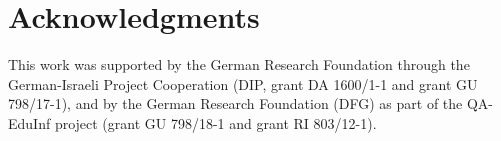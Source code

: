 \documentclass[11pt,a4paper]{article}
\begin{document}
\section*{Acknowledgments}

This work was supported by the German Research Foundation through the German-Israeli Project Cooperation (DIP, grant DA 1600/1-1 and grant GU 798/17-1), and 
by the German Research Foundation (DFG) as part of the QA-EduInf project (grant GU 798/18-1 and grant RI 803/12-1). 

%
% 



%
\end{document}
